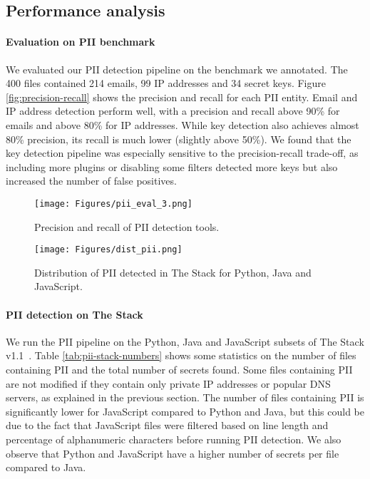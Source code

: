 \documentclass[10pt]{article} \usepackage{iclr2023_conference,times}
\begin{document}
\subsection{Performance analysis}
\paragraph{Evaluation on PII benchmark} We evaluated our PII detection pipeline on the benchmark we annotated. The 400 files contained 214 emails, 99 IP addresses and 34 secret keys. Figure \ref{fig:precision-recall} shows the precision and recall for each PII entity. Email and IP address detection perform well, with a precision and recall above 90\% for emails and above 80\% for IP addresses. While key detection also achieves almost 80\% precision, its recall is much lower (slightly above 50\%). We found that the key detection pipeline was especially sensitive to the precision-recall trade-off, as including more plugins or disabling some filters detected more keys but also increased the number of false positives.

\begin{figure}[t] 
\centering
   \begin{minipage}[t]{0.40\linewidth}
      \centering \texttt{[image: Figures/pii\_eval\_3.png]}
      \caption{Precision and recall of PII detection tools.}
      \label{fig:precision-recall} 
   \end{minipage}\hspace{15mm}
   \begin{minipage}[t]{0.40\linewidth}
      \centering \texttt{[image: Figures/dist\_pii.png]}
      \caption{Distribution of PII detected in The Stack for Python, Java and JavaScript.}
      \label{fig:secrets-dist} 
\end{minipage}
\end{figure}

\paragraph{PII detection on The Stack}
We run the PII pipeline on the Python, Java and JavaScript subsets of The Stack v1.1~\citep{Kocetkov2022TheStack}. Table \ref{tab:pii-stack-numbers} shows some statistics on the number of files containing PII and the total number of secrets found. Some files containing PII are not modified if they contain only private IP addresses or popular DNS servers, as explained in the previous section. The number of files containing PII is significantly lower for JavaScript compared to Python and Java, but this could be due to the fact that JavaScript files were filtered based on line length and percentage of alphanumeric characters before running PII detection. We also observe that Python and JavaScript have a higher number of secrets per file compared to Java.
\end{document}
